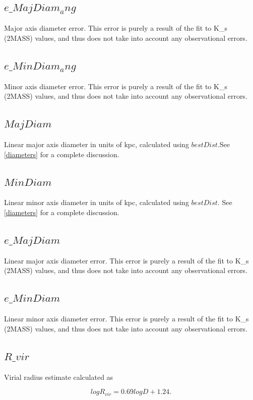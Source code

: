 \documentclass[iop]{emulateapj-rtx4}
\begin{document}
\subsection{$e\_MajDiam_ang$}
Major axis diameter error. This error is purely a result of the fit to K\_s (2MASS) values, and thus does not take into account any observational errors.

\subsection{$e\_MinDiam_ang$}
Minor axis diameter error. This error is purely a result of the fit to K\_s (2MASS) values, and thus does not take into account any observational errors.

\subsection{$MajDiam$}
Linear major axis diameter in units of kpc, calculated using $bestDist$.See \ref{diameters} for a complete discussion.

\subsection{$MinDiam$}
Linear minor axis diameter in units of kpc, calculated using $bestDist$. See \ref{diameters} for a complete discussion.

\subsection{$e\_MajDiam$}
Linear major axis diameter error. This error is purely a result of the fit to K\_s (2MASS) values, and thus does not take into account any observational errors.

\subsection{$e\_MinDiam$}
Linear minor axis diameter error. This error is purely a result of the fit to K\_s (2MASS) values, and thus does not take into account any observational errors.

\subsection{$R\_vir$}
Virial radius estimate calculated as

\begin{equation}
log R_{vir} = 0.69 log D + 1.24.
\end{equation}
\end{document}
